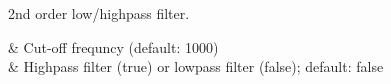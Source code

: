 2nd order low/highpass filter.

\begin{tscattributes}
 & Cut-off frequncy (default: 1000)   \\
 & Highpass filter (true) or lowpass filter (false);  default: false\\
\end{tscattributes}
